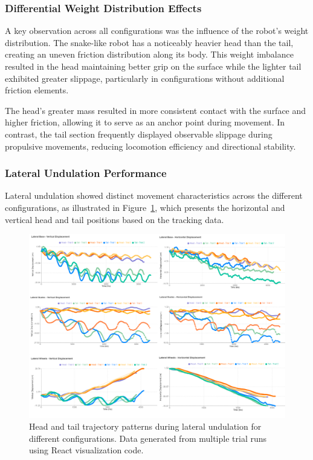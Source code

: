 \documentclass[12pt,a4paper]{report}
\begin{document}
\subsubsection{Differential Weight Distribution Effects}
A key observation across all configurations was the influence of the robot's weight distribution. The snake-like robot has a noticeably heavier head than the tail, creating an uneven friction distribution along its body. This weight imbalance resulted in the head maintaining better grip on the surface while the lighter tail exhibited greater slippage, particularly in configurations without additional friction elements.

The head's greater mass resulted in more consistent contact with the surface and higher friction, allowing it to serve as an anchor point during movement. In contrast, the tail section frequently displayed observable slippage during propulsive movements, reducing locomotion efficiency and directional stability.

\subsubsection{Lateral Undulation Performance}
Lateral undulation showed distinct movement characteristics across the different configurations, as illustrated in Figure~\ref{fig:lateral_undulation_analysis}, which presents the horizontal and vertical head and tail positions based on the tracking data.

\begin{figure}[H]
    \centering
    \includegraphics[width=1\textwidth]{media/lateral_undulation_trials.png}
    \caption{Head and tail trajectory patterns during lateral undulation for different configurations. Data generated from multiple trial runs using React visualization code.}
    \label{fig:lateral_undulation_analysis}
\end{figure}
\end{document}
